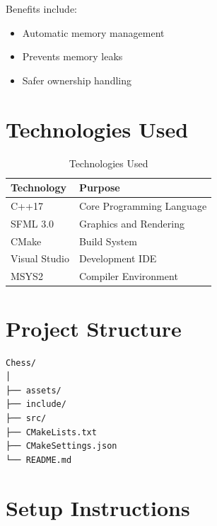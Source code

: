 \documentclass[11pt]{article}
\begin{document}
Benefits include:

\begin{itemize}
    \item Automatic memory management
    \item Prevents memory leaks
    \item Safer ownership handling
\end{itemize}


\section{Technologies Used}

\begin{table}[H]
\centering
\begin{tabular}{|l|l|}
\hline
Technology & Purpose \\
\hline
C++17 & Core Programming Language \\
SFML 3.0 & Graphics and Rendering \\
CMake & Build System \\
Visual Studio & Development IDE \\
MSYS2 & Compiler Environment \\
\hline
\end{tabular}
\caption{Technologies Used}
\end{table}


\section{Project Structure}

\begin{verbatim}
Chess/
│
├── assets/
├── include/
├── src/
├── CMakeLists.txt
├── CMakeSettings.json
└── README.md
\end{verbatim}


\section{Setup Instructions}
\end{document}
